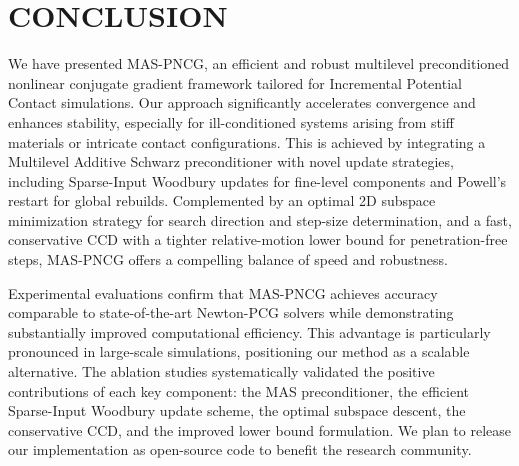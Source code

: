 \documentclass[acmtog,anonymous,review,screen,nonacm]{acmart}
\begin{document}
\section{CONCLUSION}
We have presented MAS-PNCG, an efficient and robust multilevel preconditioned nonlinear conjugate gradient framework tailored for Incremental Potential Contact simulations. Our approach significantly accelerates convergence and enhances stability, especially for ill-conditioned systems arising from stiff materials or intricate contact configurations. This is achieved by integrating a Multilevel Additive Schwarz preconditioner with novel update strategies, including Sparse-Input Woodbury updates for fine-level components and Powell’s restart for global rebuilds. Complemented by an optimal 2D subspace minimization strategy for search direction and step-size determination, and a fast, conservative CCD with a tighter relative-motion lower bound for penetration-free steps, MAS-PNCG offers a compelling balance of speed and robustness.

Experimental evaluations confirm that MAS-PNCG achieves accuracy comparable to state-of-the-art Newton-PCG solvers while demonstrating substantially improved computational efficiency. This advantage is particularly pronounced in large-scale simulations, positioning our method as a scalable alternative. The ablation studies systematically validated the positive contributions of each key component: the MAS preconditioner, the efficient Sparse-Input Woodbury update scheme, the optimal subspace descent, the conservative CCD, and the improved lower bound formulation. We plan to release our implementation as open-source code to benefit the research community.



\newpage
\end{document}
